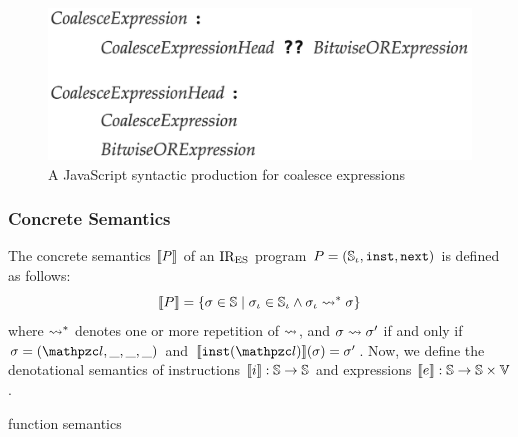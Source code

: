 \begin{figure}
  \centering
  \includegraphics[width=.8\columnwidth]{img/coalesce-prod.png}
  \caption{A JavaScript syntactic production for coalesce expressions}
  \label{fig:coalesce-prod}
\end{figure}




\subsubsection{Concrete Semantics}

The concrete semantics $\llbracket{P}\rrbracket$ of an $\text{IR}_\text{ES}$ program $P = (\mathbb{S}_\iota,
\texttt{inst}, \texttt{next})$ is defined as follows:
\[
  \llbracket{P}\rrbracket = \{ \sigma \in \mathbb{S} \mid \sigma_\iota \in \mathbb{S}_\iota \wedge \sigma_\iota \leadsto^* \sigma \}
\]
where $\leadsto^*$ denotes one or more repetition of $\leadsto$, and $\sigma \leadsto
\sigma'$ if and only if $\st = (\lab, \_, \_, \_)$ and $\sem{\getinst(\lab)}(\st) =
\st'$. Now, we define the denotational semantics of instructions $\llbracket{i}\rrbracket:
\mathbb{S} \rightarrow \mathbb{S}$ and expressions $\llbracket{e}\rrbracket: \mathbb{S} \rightarrow
\mathbb{S} \times \mathbb{V}$.

\todo function semantics

